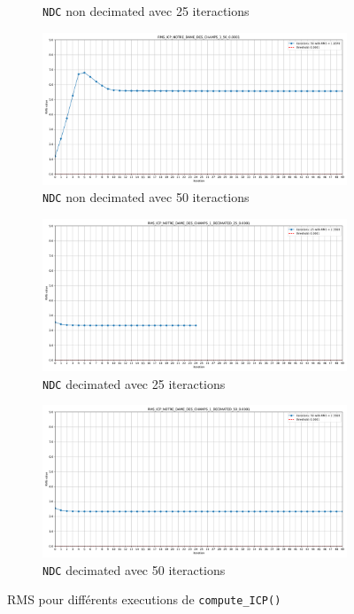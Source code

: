 \documentclass[../5RO17_TP4.tex]{subfiles}
\begin{document}
\begin{figure}[H]
\begin{subfigure}[b]{0.475\textwidth}
        \caption{\texttt{NDC} non decimated avec 25 iteractions}
        \label{}
    \end{subfigure}\hfill
    \begin{subfigure}[b]{0.475\textwidth}
        \centering
        \includegraphics[width=\linewidth]{images/RMS_ICP_NOTRE_DAME_DES_CHAMPS_1_50_0.0001.png}
        \caption{\texttt{NDC} non decimated avec 50 iteractions}
        \label{}
    \end{subfigure}\hfill
    \begin{subfigure}[b]{0.475\textwidth}
        \centering
        \includegraphics[width=\linewidth]{images/RMS_ICP_NOTRE_DAME_DES_CHAMPS_1_DECIMATED_25_0.0001.png}
        \caption{\texttt{NDC} decimated avec 25 iteractions}
        \label{}
    \end{subfigure}\hfill
    \begin{subfigure}[b]{0.475\textwidth}
        \centering
        \includegraphics[width=\linewidth]{images/RMS_ICP_NOTRE_DAME_DES_CHAMPS_1_DECIMATED_50_0.0001.png}
        \caption{\texttt{NDC} decimated avec 50 iteractions}
        \label{}
    \end{subfigure}
    \caption{RMS pour différents executions de \texttt{compute\_ICP()}}
    \label{}
\end{figure}
\end{document}
